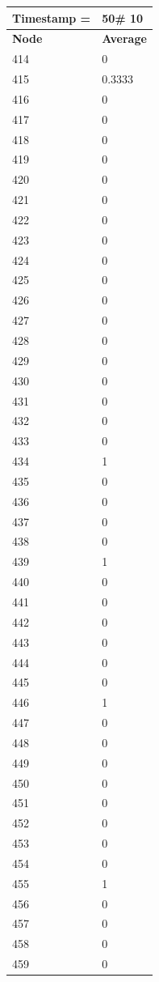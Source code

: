 \begin{tabular}{|l||l|}
\hline
\textbf{Timestamp =} & \textbf{50}\# 10\\\hline
	\textbf{Node} & \textbf{Average} \\ \hline
\hline
	414 & 0 \\ \hline
	415 & 0.3333 \\ \hline
	416 & 0 \\ \hline
	417 & 0 \\ \hline
	418 & 0 \\ \hline
	419 & 0 \\ \hline
	420 & 0 \\ \hline
	421 & 0 \\ \hline
	422 & 0 \\ \hline
	423 & 0 \\ \hline
	424 & 0 \\ \hline
	425 & 0 \\ \hline
	426 & 0 \\ \hline
	427 & 0 \\ \hline
	428 & 0 \\ \hline
	429 & 0 \\ \hline
	430 & 0 \\ \hline
	431 & 0 \\ \hline
	432 & 0 \\ \hline
	433 & 0 \\ \hline
	434 & 1 \\ \hline
	435 & 0 \\ \hline
	436 & 0 \\ \hline
	437 & 0 \\ \hline
	438 & 0 \\ \hline
	439 & 1 \\ \hline
	440 & 0 \\ \hline
	441 & 0 \\ \hline
	442 & 0 \\ \hline
	443 & 0 \\ \hline
	444 & 0 \\ \hline
	445 & 0 \\ \hline
	446 & 1 \\ \hline
	447 & 0 \\ \hline
	448 & 0 \\ \hline
	449 & 0 \\ \hline
	450 & 0 \\ \hline
	451 & 0 \\ \hline
	452 & 0 \\ \hline
	453 & 0 \\ \hline
	454 & 0 \\ \hline
	455 & 1 \\ \hline
	456 & 0 \\ \hline
	457 & 0 \\ \hline
	458 & 0 \\ \hline
	459 & 0 \\ \hline
\end{tabular}
